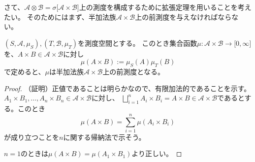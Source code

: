 \documentclass[../root.tex]{subfiles}
\begin{document}
さて、$ \mathscr{A}\otimes\mathscr{B}=\sigma\lbrack \mathscr{A}\times\mathscr{B} \rbrack $上の測度を構成するために拡張定理を用いることを考えたい。
そのためにはまず、半加法族$ \mathscr{A}\times\mathscr{B} $上の前測度を与えなければならない。

\begin{Lem}{}{}
$ ( S, \mathscr{A}, \mu_{S} ), ( T, \mathscr{B}, \mu_{T} ) $を測度空間とする。
このとき集合函数$ \mu\colon\mathscr{A}\times\mathscr{B}\rightarrow\lbrack 0, \infty \rbrack $を、$ A\times B\in\mathscr{A}\times\mathscr{B} $に対し
\[ \mu( A\times B ):=\mu_{S}( A )\mu_{T}( B ) \]
で定めると、$ \mu $は半加法族$ \mathscr{A}\times\mathscr{B} $上の前測度となる。
\end{Lem}

\begin{proof}
（証明）正値であることは明らかなので、有限加法的であることを示す。$ A_{1}\times B_{1}, \dotsc, A_{n}\times B_{n}\in\mathscr{A}\times\mathscr{B} $に対し、
$ \bigsqcup_{i=1}^{n}A_{i}\times B_{i}=A\times B\in\mathscr{A}\times\mathscr{B} $であるとする。このとき
\[ \mu( A\times B )=\sum_{i=1}^{n}\mu( A_{i}\times B_{i} ) \]
が成り立つことを$ n $に関する帰納法で示そう。

$ n=1 $のときは$ \mu( A\times B )=\mu( A_{1}\times B_{1} ) $より正しい。


\end{proof}
\end{document}
